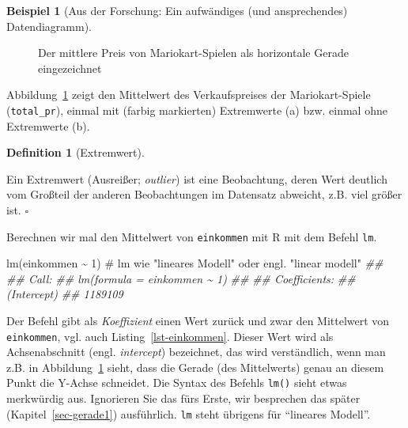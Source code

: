 \documentclass[
  a4paper,
]{scrbook}
\newenvironment{Shaded}{\begin{snugshade}}{\end{snugshade}}
\newcommand{\CommentTok}[1]{\textcolor[rgb]{0.37,0.37,0.37}{#1}}
\newcommand{\DecValTok}[1]{\textcolor[rgb]{0.68,0.00,0.00}{#1}}
\newcommand{\DocumentationTok}[1]{\textcolor[rgb]{0.37,0.37,0.37}{\textit{#1}}}
\newcommand{\FunctionTok}[1]{\textcolor[rgb]{0.28,0.35,0.67}{#1}}
\newcommand{\NormalTok}[1]{\textcolor[rgb]{0.00,0.23,0.31}{#1}}
\newcommand{\SpecialCharTok}[1]{\textcolor[rgb]{0.37,0.37,0.37}{#1}}
\theoremstyle{definition}
\newtheorem{example}{Beispiel}[chapter]
\theoremstyle{definition}
\newtheorem{definition}{Definition}[chapter]
\theoremstyle{definition}
\theoremstyle{remark}
\begin{document}
\begin{example}[Aus der Forschung: Ein aufwändiges (und ansprechendes)
Datendiagramm]
\begin{figure}
\begin{minipage}{0.50\linewidth}
{}


\end{minipage}%

\caption{\label{fig-mw2}Der mittlere Preis von Mariokart-Spielen als
horizontale Gerade eingezeichnet}

\end{figure}%

Abbildung~\ref{fig-mw2} zeigt den Mittelwert des Verkaufspreises der
Mariokart-Spiele (\texttt{total\_pr}), einmal mit (farbig markierten)
Extremwerte (a) bzw. einmal ohne Extremwerte (b).

\begin{definition}[Extremwert]\protect\hypertarget{def-extremwert}{}\label{def-extremwert}

Ein Extremwert (Ausreißer; \emph{outlier}) ist eine Beobachtung, deren
Wert deutlich vom Großteil der anderen Beobachtungen im Datensatz
abweicht, z.B. viel größer ist. \(\square\)

\end{definition}

Berechnen wir mal den Mittelwert von \texttt{einkommen} mit R mit dem
Befehl \texttt{lm}.

\begin{Shaded}
\begin{Highlighting}[]
\FunctionTok{lm}\NormalTok{(einkommen }\SpecialCharTok{\textasciitilde{}} \DecValTok{1}\NormalTok{)  }\CommentTok{\# lm wie "lineares Modell" oder engl. "linear modell"}
\DocumentationTok{\#\# }
\DocumentationTok{\#\# Call:}
\DocumentationTok{\#\# lm(formula = einkommen \textasciitilde{} 1)}
\DocumentationTok{\#\# }
\DocumentationTok{\#\# Coefficients:}
\DocumentationTok{\#\# (Intercept)  }
\DocumentationTok{\#\#     1189109}
\end{Highlighting}
\end{Shaded}

Der Befehl gibt als \emph{Koeffizient} einen Wert zurück und zwar den
Mittelwert von \texttt{einkommen}, vgl. auch
Listing~\ref{lst-einkommen}. Dieser Wert wird als Achsenabschnitt (engl.
\emph{intercept}) bezeichnet, das wird verständlich, wenn man z.B. in
Abbildung~\ref{fig-mw2} sieht, dass die Gerade (des Mittelwerts) genau
an diesem Punkt die Y-Achse schneidet. Die Syntax des Befehls
\texttt{lm()} sieht etwas merkwürdig aus. Ignorieren Sie das fürs Erste,
wir besprechen das später (Kapitel~\ref{sec-gerade1}) ausführlich.
\texttt{lm} steht übrigens für ``lineares Modell''.


\end{example}
\end{document}
